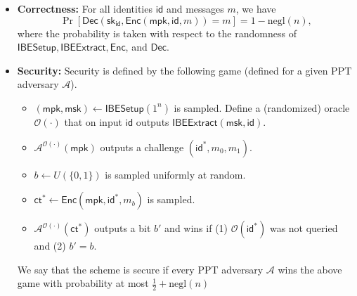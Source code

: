 \documentclass[11pt]{article}
\newcommand{\negl}[1]{\text{negl}(#1)}
\newcommand{\Enc}{\mathsf{Enc}}
\newcommand{\Dec}{\mathsf{Dec}}
\newcommand{\sk}{\mathsf{sk}}
\newcommand{\msk}{\mathsf{msk}}
\newcommand{\mpk}{\mathsf{mpk}}
\newcommand{\id}{\mathsf{id}}
\newcommand{\ct}{\mathsf{ct}}
\newcommand{\Setup}{\mathsf{IBESetup}}
\newcommand{\Extract}{\mathsf{IBEExtract}}
\begin{document}
\begin{itemize}
    \item \textbf{Correctness:} For all identities $\id$ and messages $m$, we have
    \[ \Pr[\Dec(\sk_{\id}, \Enc(\mpk, \id, m)) = m] = 1-\negl n,
    \]
    where the probability is taken with respect to the randomness of $\Setup, \Extract, \Enc$, and $\Dec$.
    \item \textbf{Security:} Security is defined by the following game (defined for a given PPT adversary $\mathcal A$). 
    \begin{itemize}
        \item $(\mpk, \msk) \gets \Setup(1^n)$ is sampled. Define a (randomized) oracle $\mathcal O(\cdot)$ that on input $\id$ outputs $\Extract(\msk, \id)$. 
        \item $\mathcal A^{\mathcal O(\cdot)}(\mpk)$ outputs a challenge $(\id^*, m_0, m_1)$. 
        \item $b\gets U(\{0, 1\})$ is sampled uniformly at random.
        \item $\ct^* \gets \Enc(\mpk, \id^*, m_b)$ is sampled. 
        \item $\mathcal A^{\mathcal O(\cdot)}(\ct^*)$ outputs a bit $b'$ and wins if (1) $\mathcal O(\id^*)$ was not queried and (2) $b' = b$. 
    \end{itemize}
We say that the scheme is secure if every PPT adversary $\mathcal A$ wins the above game with probability at most $\frac 1 2 + \negl n$
\end{itemize} 
\end{document}
